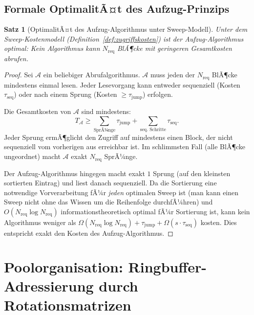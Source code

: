 ﻿\documentclass[a4paper,12pt]{article}
\theoremstyle{definition}
\theoremstyle{plain}
\newtheorem{satz}{Satz}[section]
\begin{document}
\subsection{Formale OptimalitÃ¤t des Aufzug-Prinzips}
\label{ssec:elevator_optimalitaet}

\begin{satz}[OptimalitÃ¤t des Aufzug-Algorithmus unter Sweep-Modell]
\label{satz:elevator_optimal}
  Unter dem Sweep-Kostenmodell (Definition~\ref{def:zugriffskosten})
  ist der Aufzug-Algorithmus optimal: Kein Algorithmus kann
  $N_{\mathrm{req}}$ BlÃ¶cke mit geringeren Gesamtkosten abrufen.
\end{satz}

\begin{proof}
  Sei $\mathcal{A}$ ein beliebiger Abrufalgorithmus.  $\mathcal{A}$ muss
  jeden der $N_{\mathrm{req}}$ BlÃ¶cke mindestens einmal lesen.  Jeder
  Lesevorgang kann entweder sequenziell (Kosten $\tau_{\mathrm{seq}}$) oder
  nach einem Sprung (Kosten $\ge \tau_{\mathrm{jump}}$) erfolgen.

  Die Gesamtkosten von $\mathcal{A}$ sind mindestens:
  \[
    T_\mathcal{A} \ge \sum_{\text{SprÃ¼nge}} \tau_{\mathrm{jump}}
                   + \sum_{\text{seq. Schritte}} \tau_{\mathrm{seq}}.
  \]
  Jeder Sprung ermÃ¶glicht den Zugriff auf mindestens einen Block, der
  nicht sequenziell vom vorherigen aus erreichbar ist.  Im schlimmsten Fall
  (alle BlÃ¶cke ungeordnet) macht $\mathcal{A}$ exakt $N_{\mathrm{req}}$
  SprÃ¼nge.

  Der Aufzug-Algorithmus hingegen macht exakt $1$ Sprung (auf den kleinsten
  sortierten Eintrag) und liest danach sequenziell.  Da die Sortierung eine
  notwendige Vorverarbeitung fÃ¼r \emph{jeden} optimalen Sweep ist (man
  kann einen Sweep nicht ohne das Wissen um die Reihenfolge durchfÃ¼hren)
  und $O(N_{\mathrm{req}} \log N_{\mathrm{req}})$ informationstheoretisch
  optimal fÃ¼r Sortierung ist, kann kein Algorithmus weniger als
  $\Omega(N_{\mathrm{req}} \log N_{\mathrm{req}}) + \tau_{\mathrm{jump}}
   + \Omega(s \cdot \tau_{\mathrm{seq}})$ kosten.  Dies entspricht exakt
  den Kosten des Aufzug-Algorithmus. 
\end{proof}

\section{Poolorganisation: Ringbuffer-Adressierung durch Rotationsmatrizen}
\label{sec:ringpool}
\end{document}
